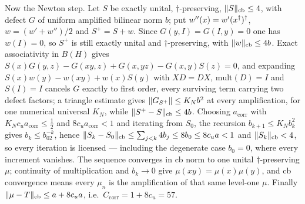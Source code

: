 Now the Newton step. Let $S$ be exactly unital, $\dagger$-preserving,
$\lVert S\rVert_{\mathrm{cb}}\le4$, with defect $G$ of uniform amplified bilinear norm $b$; put
$w''(x)=w'(x^{\dagger})^{\dagger}$, $w=(w'+w'')/2$ and $S^{+}=S+w$. Since $G(y,I)=G(I,y)=0$ one has
$w(I)=0$, so $S^{+}$ is still exactly unital and $\dagger$-preserving, with
$\lVert w\rVert_{\mathrm{cb}}\le4b$. Exact associativity in $B(H)$ gives
$S(x)G(y,z)-G(xy,z)+G(x,yz)-G(x,y)S(z)=0$, and expanding $S(x)w(y)-w(xy)+w(x)S(y)$ with
$XD=DX$, $\mathrm{mult}(D)=I$ and $S(I)=I$ cancels $G$ exactly to first order, every
surviving term carrying two defect factors; a triangle estimate gives
$\lVert G_{S^{+}}\rVert\le K_Nb^{2}$ at every amplification, for one numerical universal $K_N$,
while $\lVert S^{+}-S\rVert_{\mathrm{cb}}\le4b$. Choosing $a_{\mathrm{corr}}$ with
$K_Nc_ua_{\mathrm{corr}}\le\tfrac12$ and $8c_ua_{\mathrm{corr}}<1$ and iterating from
$S_0$, the recursion $b_{k+1}\le K_Nb_k^{2}$ gives $b_k\le b_02^{-k}$, hence
$\lVert S_k-S_0\rVert_{\mathrm{cb}}\le\sum_{j<k}4b_j\le8b_0\le8c_ua<1$ and
$\lVert S_k\rVert_{\mathrm{cb}}<4$, so every iteration is licensed --- including the degenerate
case $b_0=0$, where every increment vanishes. The sequence converges in cb norm to one
unital $\dagger$-preserving $\mu$; continuity of multiplication and $b_k\to0$ give
$\mu(xy)=\mu(x)\mu(y)$, and cb convergence means every $\mu_n$ is the amplification of that
same level-one $\mu$. Finally $\lVert \mu-T\rVert_{\mathrm{cb}}\le a+8c_ua$, i.e.\
$C_{\mathrm{corr}}=1+8c_u=57$.

